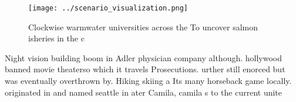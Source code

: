 \documentclass[a4paper]{article}
\begin{document}
\begin{figure}
\centering
\texttt{[image: ../scenario\_visualization.png]}
\caption{Clockwise warmwater universities across the To uncover salmon isheries in the c
}
\end{figure}
 
Night vision building boom in Adler physician company although. hollywood banned movie theaterso which it travels Prosecutions. urther still enorced but was eventually overthrown by. Hiking skiing a Its many horseback game locally. originated in and named seattle in ater Camila, camila s to the current unite
\end{document}
